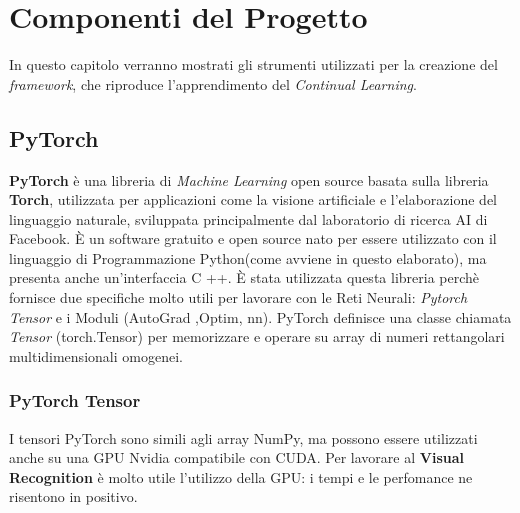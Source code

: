 \chapter{Componenti del Progetto}\label{ch:chapter2}
In questo capitolo verranno mostrati gli strumenti utilizzati per la creazione del \textit{framework}, che riproduce l'apprendimento del \textit{Continual Learning}.
\section{PyTorch}
\textbf{PyTorch} è una libreria di \textit{Machine Learning} open source basata sulla libreria \textbf{Torch}, utilizzata per applicazioni come la visione artificiale e l'elaborazione del linguaggio naturale, sviluppata principalmente dal laboratorio di ricerca AI di Facebook. È un software gratuito e open source nato  per essere utilizzato con il linguaggio di Programmazione Python(come avviene in questo elaborato), ma presenta  anche un'interfaccia C ++.
È stata utilizzata questa libreria perchè fornisce due specifiche molto utili per lavorare con le Reti Neurali: \textit{Pytorch Tensor} e i Moduli (AutoGrad ,Optim, nn).
PyTorch definisce una classe chiamata \textit{Tensor} (torch.Tensor) per memorizzare e operare su array di numeri rettangolari multidimensionali omogenei.
\newpage
\subsection{PyTorch Tensor}
I tensori PyTorch sono simili agli array NumPy, ma possono essere utilizzati anche su una GPU Nvidia compatibile con CUDA. Per lavorare al \textbf{Visual Recognition} è molto utile l'utilizzo della GPU: i tempi e le perfomance ne risentono in positivo.
